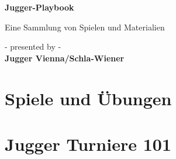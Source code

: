 \documentclass[twoside, a4paper]{article}
\begin{document}
\begin{titlepage}
   \begin{center}
       \vspace*{1cm}

       \textbf{\Huge Jugger-Playbook}

       \vspace{0.5cm}
        {\large Eine Sammlung von Spielen und Materialien}
            
       \vspace{1.5cm}

        {- presented by -}\\\vspace{0.5cm}
       \textbf{\large Jugger Vienna/Schla-Wiener}

    
            
   \end{center}
\end{titlepage}

\tableofcontents
\newpage

\section*{\centering \Huge Spiele und Übungen}



\newpage
\section*{\centering \Huge Jugger Turniere 101}


\end{document}
